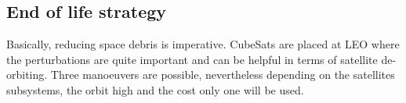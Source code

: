 \documentclass{article}
\begin{document}
\subsection{End of life strategy}

Basically, reducing space debris is imperative. CubeSats are placed at LEO where the perturbations are quite important and can be helpful in terms of satellite de-orbiting. Three manoeuvers are possible, nevertheless depending on the satellites subsystems, the orbit high and the cost only one will be used.
\end{document}
